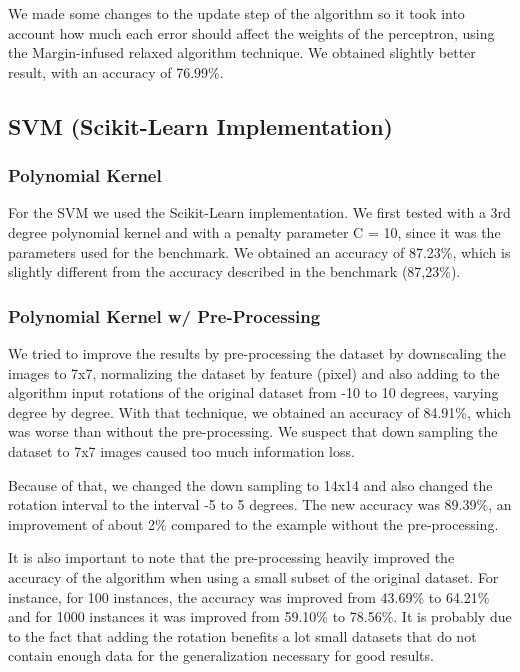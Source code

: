 \documentclass{article}
\begin{document}
We made some changes to the update step of the algorithm so it took into account how much
each error should affect the weights of the perceptron, using the Margin-infused relaxed algorithm
technique. We obtained slightly better result, with an accuracy of 76.99\%.

\subsection{SVM (Scikit-Learn Implementation)}

\subsubsection{Polynomial Kernel}

For the SVM we used the Scikit-Learn implementation. We first tested with a 3rd degree polynomial kernel and with a penalty parameter C = 10, since
it was the parameters used for the benchmark. We obtained an accuracy of 87.23\%, which is slightly different from the accuracy described in the benchmark (87,23\%).

\subsubsection{Polynomial Kernel w/ Pre-Processing}

We tried to improve the results by pre-processing the dataset by downscaling the images to 7x7, normalizing the dataset by feature (pixel) and also adding
to the algorithm input rotations of the original dataset from -10 to 10 degrees, varying degree by degree.
With that technique, we obtained an accuracy of 84.91\%, which was worse than without the pre-processing. We suspect that down sampling the dataset
to 7x7 images caused too much information loss.

Because of that, we changed the down sampling to 14x14 and also changed the rotation interval to the interval -5 to 5 degrees.
The new accuracy was 89.39\%, an improvement of about 2\% compared to the example without the pre-processing.

It is also important to note that the pre-processing heavily improved the accuracy of the algorithm when using a small subset of the
original dataset. For instance, for 100 instances, the accuracy was improved from 43.69\% to 64.21\% and for 1000 instances it was
improved from 59.10\% to 78.56\%. It is probably due to the fact that adding the rotation benefits a lot small datasets that do not contain
enough data for the generalization necessary for good results.
\end{document}
